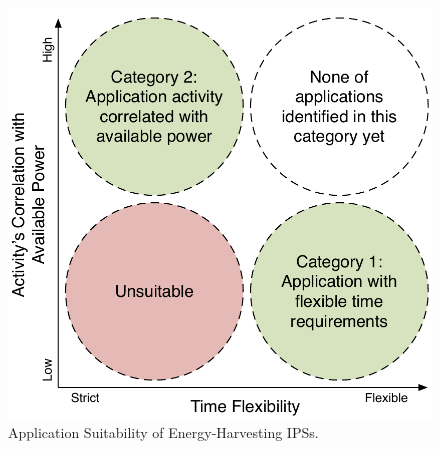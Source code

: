 \begin{figure}
  \centering
  \includegraphics[width=0.8\columnwidth]{ch1_intro/figures/appsuit2}
  \caption{Application Suitability of Energy-Harvesting IPSs.}
  \label{fig:appsuit}
\end{figure}


